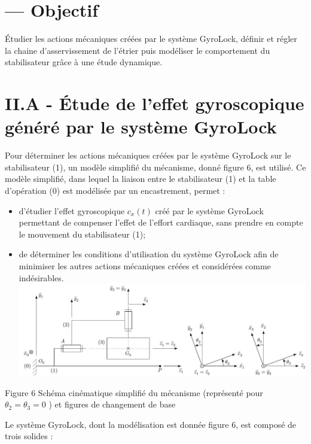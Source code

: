\documentclass[10pt]{article}
\begin{document}
\section{— Objectif}
Étudier les actions mécaniques créées par le système GyroLock, définir et régler la chaine d'asservissement de l'étrier puis modéliser le comportement du stabilisateur grâce à une étude dynamique.

\section{II.A - Étude de l'effet gyroscopique généré par le système GyroLock}
Pour déterminer les actions mécaniques créées par le système GyroLock sur le stabilisateur (1), un modèle simplifié du mécanisme, donné figure 6, est utilisé. Ce modèle simplifié, dans lequel la liaison entre le stabilisateur (1) et la table d'opération (0) est modélisée par un encastrement, permet :

\begin{itemize}
  \item d'étudier l'effet gyroscopique $c_{x}(t)$ créé par le système GyroLock permettant de compenser l'effet de l'effort cardiaque, sans prendre en compte le mouvement du stabilisateur (1);

  \item de déterminer les conditions d'utilisation du système GyroLock afin de minimiser les autres actions mécaniques créées et considérées comme indésirables.
\includegraphics[max width=\textwidth, center]{2023_07_26_54f5e859400a10e656ddg-04}

\end{itemize}

Figure 6 Schéma cinématique simplifié du mécanisme (représenté pour $\theta_{2}=\theta_{3}=0$ ) et figures de changement de base

Le système GyroLock, dont la modélisation est donnée figure 6, est composé de trois solides :
\end{document}
